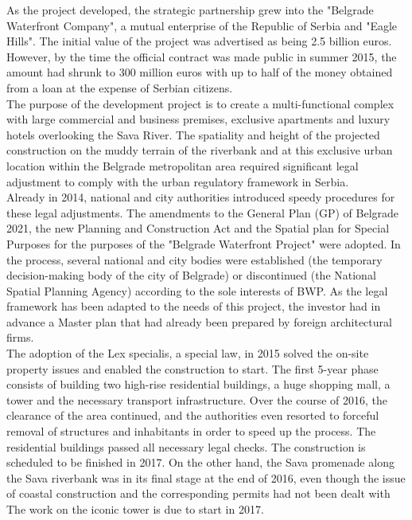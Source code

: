 \documentclass[11pt]{report}
\begin{document}
\begin{itemize}
As the project developed, the strategic partnership grew into the "Belgrade Waterfront Company", a mutual enterprise of the Republic of Serbia  and "Eagle Hills". The initial value of the project was advertised as being 2.5 billion euros. However, by the time the official contract was made public in summer 2015, the amount had shrunk to 300 million euros with up to half of the money obtained from a loan at the expense of Serbian citizens.
\\

The purpose of the development project is to create a multi-functional complex with large commercial and business premises, exclusive apartments and luxury hotels overlooking the Sava River. The spatiality and height of the projected construction on the muddy terrain of the riverbank and at this exclusive urban location within the Belgrade metropolitan area required significant legal adjustment to comply with the urban regulatory framework in Serbia.
\\

Already in 2014, national and city authorities introduced speedy procedures for these legal adjustments. The amendments to the General Plan (GP) of Belgrade 2021, the new Planning and Construction Act and the Spatial plan for Special Purposes for the purposes of the "Belgrade Waterfront Project" were adopted. In the process, several national and city bodies were established (the temporary decision-making body of the city of Belgrade) or discontinued (the National Spatial Planning Agency) according to the sole interests of BWP. As the legal framework has been adapted to the needs of this project, the investor had in advance a Master plan that had already been prepared by foreign architectural firms.
\\

The adoption of the Lex specialis, a special law, in 2015 solved the on-site property issues and enabled the construction to start. The first 5-year phase consists of building two high-rise residential buildings, a huge shopping mall, a tower and the necessary transport infrastructure. Over the course of 2016, the clearance of the area continued, and the authorities even resorted to forceful removal of structures and inhabitants in order to speed up the process. The residential buildings passed all necessary legal checks. The construction is scheduled to be finished in 2017. On the other hand, the Sava promenade along the Sava riverbank was in its final stage at the end of 2016, even though the issue of coastal construction and the corresponding permits had not been dealt with 
The work on the iconic tower is due to start in 2017.
\\


\end{itemize}
\end{document}
